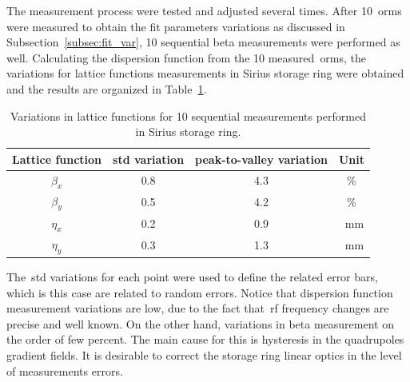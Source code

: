 The measurement process were tested and adjusted several times. After 10~\gls{orm}s were measured to obtain the fit parameters variations as discussed in Subsection~\ref{subsec:fit_var}, 10 sequential beta measurements were performed as well. Calculating the dispersion function from the 10 measured~\gls{orm}s, the variations for lattice functions measurements in Sirius storage ring were obtained and the results are organized in Table~\ref{tab:twiss_var_meas}. 
\begin{table}[h!]
    \centering
    \caption{Variations in lattice functions for 10 sequential measurements performed in Sirius storage ring.}
    \label{tab:twiss_var_meas}
    \begin{tabular}{cccc}
        \toprule\toprule
        Lattice function & std variation & peak-to-valley variation & Unit \\
        \hline
        $\beta_x$ & \num{0.8}& \num{4.3} & \%\\
        $\beta_y$ & \num{0.5} & \num{4.2}& \% \\
        $\eta_x$ & \num{0.2} & \num{0.9} & \SI{}{\milli\meter}\\
        $\eta_y$ & \num{0.3} & \num{1.3} & \SI{}{\milli\meter} \\
        \bottomrule\bottomrule
    \end{tabular}
\end{table}

The~\gls{std} variations for each point were used to define the related error bars, which is this case are related to random errors. Notice that dispersion function measurement variations are low, due to the fact that~\gls{rf} frequency changes are precise and well known. On the other hand, variations in beta measurement on the order of few percent. The main cause for this is hysteresis in the quadrupoles gradient fields. It is desirable to correct the storage ring linear optics in the level of measurements errors.

